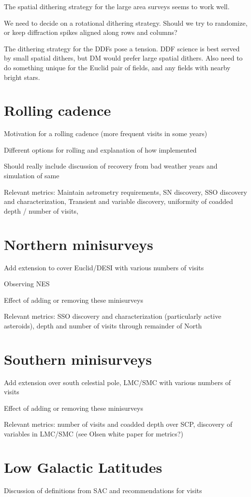 The spatial dithering strategy for the large area surveys seems to work well.

We need to decide on a rotational dithering strategy. Should we try to randomize, or keep diffraction spikes aligned along rows and columns?

The dithering strategy for the DDFs pose a tension. DDF science is best served by small spatial dithers, but DM would prefer large spatial dithers. Also need to do something unique for the Euclid pair of fields, and any fields with nearby bright stars.


\section{Rolling cadence}
Motivation for a rolling cadence (more frequent visits in some years)

Different options for rolling and explanation of how implemented

Should really include discussion of recovery from bad weather years and simulation of same

Relevant metrics: Maintain astrometry requirements, SN discovery, SSO discovery and characterization,  Transient and variable discovery, uniformity of coadded depth / number of visits, 

\section{Northern minisurveys}
Add extension to cover Euclid/DESI with various numbers of visits

Observing NES 

Effect of adding or removing these minisurveys

Relevant metrics: SSO discovery and characterization (particularly active asteroids), depth and number of visits through remainder of North

\section{Southern minisurveys}
Add extension over south celestial pole, LMC/SMC with various numbers of visits

Effect of adding or removing these minisurveys

Relevant metrics: number of visits and coadded depth over SCP, discovery of variables in LMC/SMC (see Olsen white paper for metrics?)

\section{Low Galactic Latitudes}
Discussion of definitions from SAC and recommendations for visits

